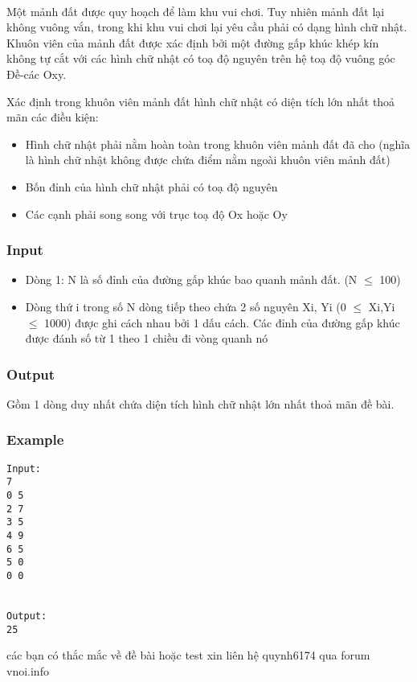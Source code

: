 

 

Một mảnh đất được quy hoạch để làm khu vui chơi. Tuy nhiên mảnh đất lại không vuông vắn, trong khi khu vui chơi lại yêu cầu phải có dạng hình chữ nhật. Khuôn viên của mảnh đất được xác định bởi một đường gấp khúc khép kín không tự cắt với các hình chữ nhật có toạ độ nguyên trên hệ toạ độ vuông góc Đề-các Oxy.

Xác định trong khuôn viên mảnh đất hình chữ nhật có diện tích lớn nhất thoả mãn các điều kiện:
\begin{itemize}
	\item Hình chữ nhật phải nằm hoàn toàn trong khuôn viên mảnh đất đã cho (nghĩa là hình chữ nhật không được chứa điểm nằm ngoài khuôn viên mảnh đất)
	\item Bốn đỉnh của hình chữ nhật phải có toạ độ nguyên
	\item Các cạnh phải song song với trục toạ độ Ox hoặc Oy
\end{itemize}

\subsubsection{Input}
\begin{itemize}
	\item Dòng 1: N là số đỉnh của đường gấp khúc bao quanh mảnh đất. (N $\le$ 100)
	\item Dòng thứ i trong số N dòng tiếp theo chứa 2 số nguyên Xi, Yi (0 $\le$ Xi,Yi $\le$ 1000) được ghi cách nhau bởi 1 dấu cách. Các đỉnh của đường gấp khúc được đánh số từ 1 theo 1 chiều đi vòng quanh nó
\end{itemize}

\subsubsection{Output}

Gồm 1 dòng duy nhất chứa diện tích hình chữ nhật lớn nhất thoả mãn đề bài.

\subsubsection{Example}
\begin{verbatim}
Input:
7
0 5
2 7
3 5
4 9
6 5
5 0
0 0


Output:
25
\end{verbatim}

các bạn có thắc mắc về đề bài hoặc test xin liên hệ quynh6174 qua forum vnoi.info
